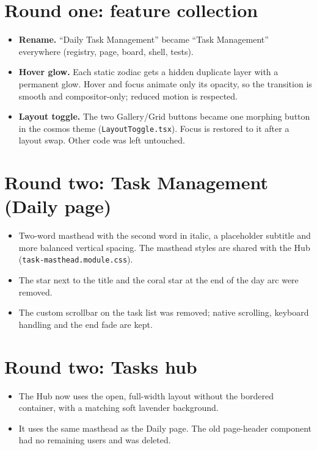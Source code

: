 \documentclass[11pt,a4paper]{article}
\begin{document}
\section{Round one: feature collection}
\begin{itemize}
\item \textbf{Rename.} ``Daily Task Management'' became ``Task Management'' everywhere (registry, page, board, shell, tests).
\item \textbf{Hover glow.} Each static zodiac gets a hidden duplicate layer with a permanent glow. Hover and focus animate only its opacity, so the transition is smooth and compositor-only; reduced motion is respected.
\item \textbf{Layout toggle.} The two Gallery/Grid buttons became one morphing button in the cosmos theme (\texttt{LayoutToggle.tsx}). Focus is restored to it after a layout swap. Other code was left untouched.
\end{itemize}

\section{Round two: Task Management (Daily page)}
\begin{itemize}
\item Two-word masthead with the second word in italic, a placeholder subtitle and more balanced vertical spacing. The masthead styles are shared with the Hub (\texttt{task-masthead.module.css}).
\item The star next to the title and the coral star at the end of the day arc were removed.
\item The custom scrollbar on the task list was removed; native scrolling, keyboard handling and the end fade are kept.
\end{itemize}

\section{Round two: Tasks hub}
\begin{itemize}
\item The Hub now uses the open, full-width layout without the bordered container, with a matching soft lavender background.
\item It uses the same masthead as the Daily page. The old page-header component had no remaining users and was deleted.
\end{itemize}
\end{document}
